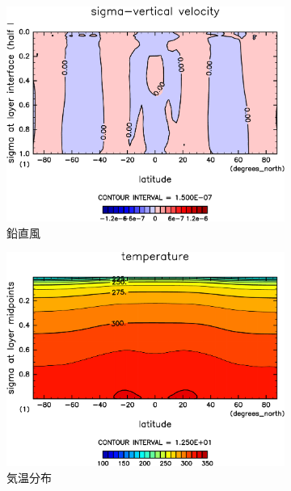 \documentclass[body]{subfiles}
\begin{document}
\begin{figure}[t]
\begin{subfigure}{.4\textwidth}
		\includegraphics[width=\columnwidth]{S2000/SigDot,time=7300:7665-crop-rotate.pdf}
		\caption{鉛直風}\label{S2000鉛直風}
	\end{subfigure}
	\begin{subfigure}{.4\textwidth}
		\centering
		\includegraphics[width=\columnwidth]{S2000/Temp,time=7300:7665-crop-rotate.pdf}
		\caption{気温分布}\label{S2000気温分布}
	\end{subfigure}
	\begin{subfigure}{.4\textwidth}
		\centering

\end{subfigure}
\end{figure}
\end{document}
